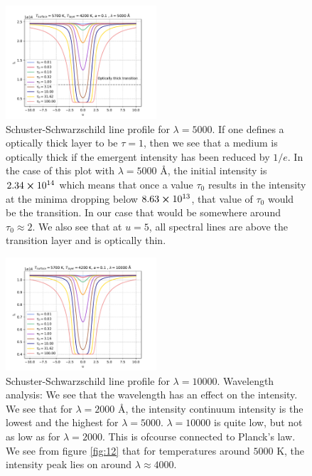 \documentclass[a4paper,11.5pt,]{article}
\begin{document}
\begin{multicols}{2}
\begin{figure}[H]
	\centering
	\includegraphics[width=0.5\textwidth]{SSA/figures/ss1.pdf}
	\caption{Schuster-Schwarzschild line profile for $\lambda = 5000$. If one defines a optically thick layer to be $\tau = 1$, then we see that a medium is optically thick if the emergent intensity has been reduced by $1/e$. In the case of this plot with $\lambda = 5000$ Å, the initial intensity is $2.34 \cross 10^{14}$ which means that once a value $\tau_0$ results in the intensity at the minima dropping below $8.63\cross 10^{13}$, that value of $\tau_0$ would be the transition. In our case that would be somewhere around $\tau_0 \approx 2 $. We also see that at $u = 5$, all spectral lines are above the transition layer and is optically thin.}
	\label{fig:23}
\end{figure}




\begin{figure}[H]
	\centering
	\includegraphics[width=0.5\textwidth]{SSA/figures/ss2.pdf}
	\caption{Schuster-Schwarzschild line profile for $\lambda = 10000$. Wavelength analysis: We see that the wavelength has an effect on the intensity. We see that for $\lambda = 2000$ Å, the intensity continuum intensity is the lowest and the highest for $\lambda = 5000$. $\lambda = 10000$ is quite low, but not as low as for $\lambda = 2000$. This is ofcourse connected to Planck's law. We see from figure \ref{fig:12} that for temperatures around $5000$ K, the intensity peak lies on around $\lambda \approx 4000$.  }
	\label{fig:24}
\end{figure}


\end{multicols}
\end{document}
